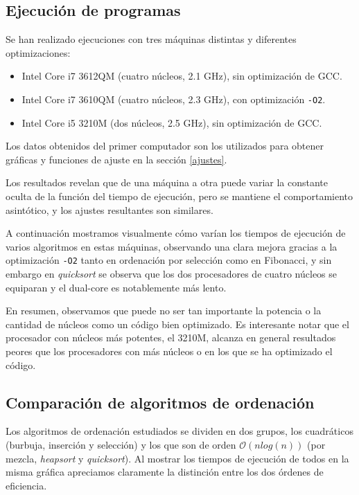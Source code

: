 
\subsection{Ejecución de programas}
Se han realizado ejecuciones con tres máquinas distintas y diferentes optimizaciones:
\begin{itemize}
\item Intel Core i7 3612QM (cuatro núcleos, 2.1 GHz), sin optimización de GCC.
\item Intel Core i7 3610QM (cuatro núcleos, 2.3 GHz), con optimización \texttt{-O2}.
\item Intel Core i5 3210M (dos núcleos, 2.5 GHz), sin optimización de GCC.
\end{itemize}
Los datos obtenidos del primer computador son los utilizados para obtener gráficas y funciones de ajuste en la sección \ref{ajustes}.

Los resultados revelan que de una máquina a otra puede variar la constante oculta de la función del tiempo de ejecución, pero se mantiene el comportamiento asintótico, y los ajustes resultantes son similares.

A continuación mostramos visualmente cómo varían los tiempos de ejecución de varios algoritmos en estas máquinas, observando una clara mejora gracias a la optimización \texttt{-O2} tanto en ordenación por selección como en Fibonacci, y sin embargo en \textit{quicksort} se observa que los dos procesadores de cuatro núcleos se equiparan y el dual-core es notablemente más lento.


En resumen, observamos que puede no ser tan importante la potencia o la cantidad de núcleos como un código bien optimizado. Es interesante notar que el procesador con núcleos más potentes, el 3210M, alcanza en general resultados peores que los procesadores con más núcleos o en los que se ha optimizado el código.

\subsection{Comparación de algoritmos de ordenación}
Los algoritmos de ordenación estudiados se dividen en dos grupos, los cuadráticos (burbuja, inserción y selección) y los que son de orden $\mathcal{O}(nlog(n))$ (por mezcla, \textit{heapsort} y \textit{quicksort}). Al mostrar los tiempos de ejecución de todos en la misma gráfica apreciamos claramente la distinción entre los dos órdenes de eficiencia.

